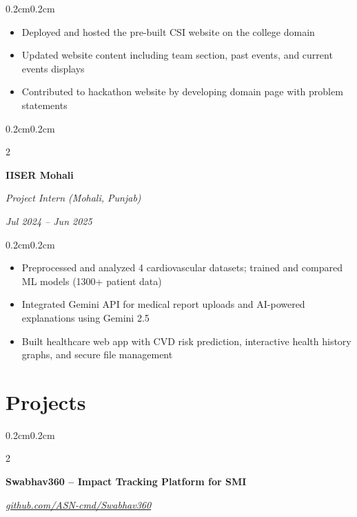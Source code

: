 \documentclass[10pt, letterpaper]{article}
\newenvironment{highlights}{
    \begin{itemize}[
        topsep=0.10cm,
        parsep=0.10cm,
        partopsep=0pt,
        itemsep=0pt,
        leftmargin=0.4cm + 10pt
    ]
}{\end{itemize}}
\newenvironment{onecolentry}{
    \begin{adjustwidth}{0.2cm}{0.2cm}
}{\end{adjustwidth}}
\newenvironment{twocolentry}[2][]{
    \onecolentry
    \def\secondColumn{#2}
    \setcolumnwidth{\fill, 4.5cm}
    \begin{paracol}{2}
}{
    \switchcolumn \raggedleft \secondColumn
    \end{paracol}
    \endonecolentry
}
\begin{document}
    \vspace{0.10 cm}
    \begin{onecolentry}
        \begin{highlights}
            \item Deployed and hosted the pre-built CSI website on the college domain
            \item Updated website content including team section, past events, and current events displays
            \item Contributed to hackathon website by developing domain page with problem statements
        \end{highlights}
    \end{onecolentry}

    \vspace{0.2 cm}

    \begin{twocolentry}{
        \textit{Jul 2024 -- Jun 2025}
    }
        \textbf{IISER Mohali}
        
        \textit{Project Intern (Mohali, Punjab)}
    \end{twocolentry}
    
    \vspace{0.10 cm}
    \begin{onecolentry}
        \begin{highlights}
            \item Preprocessed and analyzed 4 cardiovascular datasets; trained and compared ML models (1300+ patient data)
            \item Integrated Gemini API for medical report uploads and AI-powered explanations using Gemini 2.5
            \item Built healthcare web app with CVD risk prediction, interactive health history graphs, and secure file management
        \end{highlights}
    \end{onecolentry}

    \section{Projects}
    
    \begin{twocolentry}{
        \textit{\href{https://github.com/ASN-cmd/Swabhav360}{github.com/ASN-cmd/Swabhav360}}
    }
        \textbf{Swabhav360 -- Impact Tracking Platform for SMI}
    \end{twocolentry}
    
\end{document}
